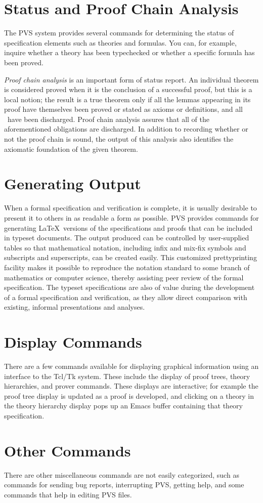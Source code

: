 \section*{Status and Proof Chain Analysis}

The PVS system provides several commands for determining the status of
specification elements such as theories and formulas.  You can, for
example, inquire whether a theory has been typechecked or whether a specific
formula has been proved.

\emph{Proof chain analysis} is an important form of status report.  An
individual theorem is considered proved when it is the conclusion of a
successful proof, but this is a local notion; the result
is a true theorem only if all the lemmas appearing in its proof have
themselves been proved or stated as axioms or definitions, and all
\tccs\ have been discharged.  Proof chain analysis assures that all of
the aforementioned obligations are discharged.  In addition to recording
whether or not the proof chain is sound, the output of this analysis
also identifies the axiomatic foundation of the given theorem.


\section*{Generating Output}

When a formal specification and verification is complete, it is usually
desirable to present it to others in as readable a form as possible.  PVS
provides commands for generating \LaTeX\ versions of the specifications
and proofs that can be included in typeset documents.  The output produced
can be controlled by user-supplied tables so that mathematical notation,
including infix and mix-fix symbols and subscripts and superscripts, can
be created easily.  This customized prettyprinting facility makes it
possible to reproduce the notation standard to some branch of mathematics
or computer science, thereby assisting peer review of the formal
specification.  The typeset specifications are also of value during the
development of a formal specification and verification, as they allow
direct comparison with existing, informal presentations and analyses.


\section*{Display Commands}

There are a few commands available for displaying graphical information
using an interface to the Tcl/Tk system.  These include the display of
proof trees, theory hierarchies, and prover commands.  These displays are
interactive; for example the proof tree display is updated as a proof is
developed, and clicking on a theory in the theory hierarchy display pops
up an Emacs buffer containing that theory specification.

\section*{Other Commands}

There are other miscellaneous commands are not easily categorized, such as
commands for sending bug reports, interrupting PVS, getting help, and some
commands that help in editing PVS files.
